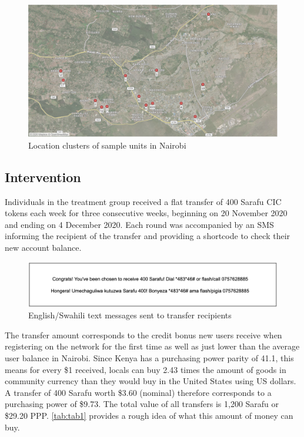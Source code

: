 \documentclass[12pt]{article}
\begin{document}
\begin{figure}[H]
    \centering
    \includegraphics[width=\textwidth]{figures/fig_6}
    \caption{Location clusters of sample units in Nairobi}
    \label{fig:fig6}
\end{figure}

\subsection{Intervention}
Individuals in the treatment group received a flat transfer of 400 Sarafu CIC tokens each week for three consecutive weeks, beginning on 20 November 2020 and ending on 4 December 2020. Each round was accompanied by an SMS informing the recipient of the transfer and providing a shortcode to check their new account balance.

\begin{figure}[H]
    \centering
    \includegraphics[width=\textwidth]{figures/fig_7}
    \caption{English/Swahili text messages sent to transfer recipients}
    \label{fig:fig7}
\end{figure}

The transfer amount corresponds to the credit bonus new users receive when registering on the network for the first time as well as just lower than the average user balance in Nairobi. Since Kenya has a purchasing power parity of 41.1, this means for every \$1 received, locals can buy 2.43 times the amount of goods in community currency than they would buy in the United States using US dollars. A transfer of 400 Sarafu worth \$3.60 (nominal) therefore corresponds to a purchasing power of \$9.73. The total value of all transfers is 1,200 Sarafu or \$29.20 PPP. \autoref{tab:tab1} provides a rough idea of what this amount of money can buy.
\end{document}
